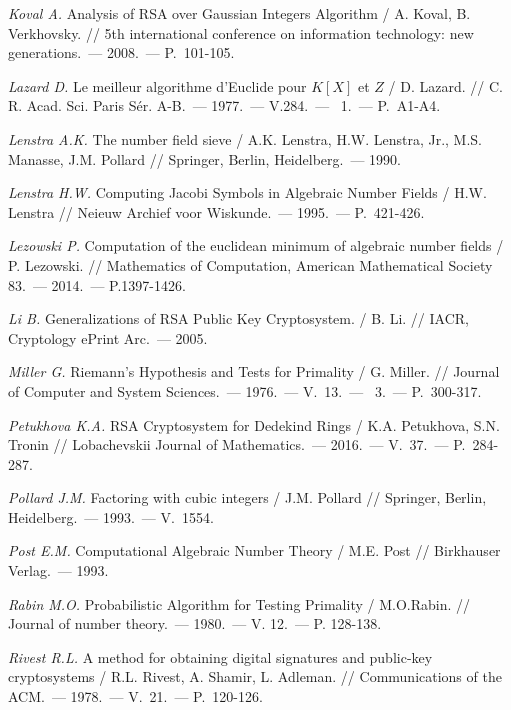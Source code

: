 \begin{thebibliography}{99}
    \textit{Koval A.} Analysis of RSA over Gaussian Integers Algorithm / A. Koval, B. Verkhovsky. // 5th international conference on information technology: new generations.~--- 2008.~--- {P.}~101-105.
    
    \textit{Lazard D.} Le meilleur algorithme d'{E}uclide pour {$K[X]$} et {$Z$} / D. Lazard. // C. R. Acad. Sci. Paris S\'er. A-B.~--- 1977.~--- V.284.~--- \textnumero~1.~--- P.~A1-A4.
    
    \textit{Lenstra A.K.} The number field sieve / A.K. Lenstra, H.W. Lenstra, Jr., M.S. Manasse, J.M. Pollard // Springer, Berlin, Heidelberg.~--- 1990.

    \textit{Lenstra H.W.} Computing Jacobi Symbols in Algebraic Number Fields / H.W. Lenstra // Neieuw Archief voor Wiskunde.~--- 1995.~--- P.~421-426.

    \textit{Lezowski P.} Computation of the euclidean minimum of algebraic number fields / P. Lezowski. // Mathematics of Computation, American Mathematical Society 83.~--- 2014.~--- P.1397-1426.

    \textit{Li B.} Generalizations of RSA Public Key Cryptosystem. / B. Li. // IACR, Cryptology ePrint Arc.~--- 2005.

    \textit{Miller G.} Riemann's Hypothesis and Tests for Primality / G. Miller. // Journal of Computer and System Sciences.~--- 1976.~--- V.~13.~--- ~3.~--- {P.}~300-317.
    
    \textit{Petukhova K.A.} RSA Cryptosystem for Dedekind Rings / K.A. Petukhova, S.N. Tronin // Lobachevskii Journal of Mathematics.~--- 2016.~--- V.~37.~--- P.~284-287.
    
    \textit{Pollard J.M.} Factoring with cubic integers / J.M. Pollard // Springer, Berlin, Heidelberg.~--- 1993.~--- V.~1554.

    \textit{Post E.M.} Computational Algebraic Number Theory / M.E. Post // Birkhauser Verlag.~--- 1993.

    \textit{Rabin M.O.} Probabilistic Algorithm for Testing Primality / M.O.Rabin. // Journal of number theory.~--- 1980.~--- V. 12.~--- P. 128-138.
    
    \textit{Rivest R.L.} A method for obtaining digital signatures and public-key cryptosystems / R.L. Rivest, A. Shamir, L. Adleman. // Communications of the ACM.~--- 1978.~--- V.~21.~--- P.~120-126.
    

\end{thebibliography}
